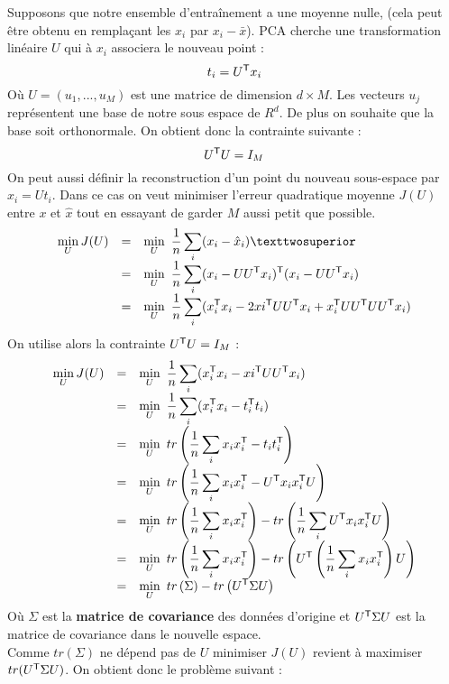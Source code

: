 Supposons que notre ensemble d'entraînement a une moyenne nulle, (cela peut être obtenu en remplaçant les $x_i$ par $x_i - \bar{x}$). PCA cherche une transformation linéaire $U$ qui à $x_i$ associera le nouveau point :
$$ t_i = U^{\mathsf{T}} x_i $$
Où $U = (u_1, ..., u_M)$ est une matrice de dimension $d \times M$. Les vecteurs $u_j$ représentent une base de notre sous espace de $R^d$. De plus on souhaite que la base soit orthonormale. On obtient donc la contrainte suivante :
$$ U^{\mathsf{T}} U = I_M $$
On peut aussi définir la reconstruction d'un point du nouveau sous-espace par $\hat{x}_i = U t_i$. Dans ce cas on veut minimiser l'erreur quadratique moyenne $J(U)$ entre $x$ et $\hat{x}$ tout en essayant de garder $M$ aussi petit que possible.
$$ \begin{array}{lll}
\displaystyle \min_U J(U)
& = & \displaystyle \min_U~\dfrac{1}{n} \sum_i (x_i - \hat{x}_i)² \\
& = & \displaystyle \min_U~\dfrac{1}{n} \sum_i (x_i - UU^\trans x_i)^\trans (x_i - UU^\trans x_i) \\
& = & \displaystyle \min_U~\dfrac{1}{n} \sum_i (x_i^\trans x_i - 2 xi^\trans UU^\trans x_i + x_i^\trans U U^\trans U U^\trans x_i)
\end{array} $$
On utilise alors la contrainte $U^{\mathsf{T}} U = I_M$ :
$$ \begin{array}{lll}
\displaystyle \min_U J(U)
& = & \displaystyle \min_U~\dfrac{1}{n} \sum_i (x_i^{\mathsf{T}} x_i - xi^{\mathsf{T}} UU^{\mathsf{T}} x_i) \\
& = & \displaystyle \min_U~\dfrac{1}{n} \sum_i (x_i^{\mathsf{T}} x_i - t_i^{\mathsf{T}} t_i) \\
& = & \displaystyle \min_U~tr \left( \dfrac{1}{n} \sum_i x_i x_i^{\mathsf{T}} - t_i t_i^{\mathsf{T}} \right) \\
& = & \displaystyle \min_U~tr \left( \dfrac{1}{n} \sum_i x_i x_i^{\mathsf{T}} - U^{\mathsf{T}} x_i x_i^{\mathsf{T}} U \right) \\
& = & \displaystyle \min_U~tr \left( \dfrac{1}{n} \sum_i x_i x_i^{\mathsf{T}} \right) - tr \left( \dfrac{1}{n} \sum_i U^{\mathsf{T}} x_i x_i^{\mathsf{T}} U \right) \\
& = & \displaystyle \min_U~tr \left( \dfrac{1}{n} \sum_i x_i x_i^{\mathsf{T}} \right) - tr \left( U^{\mathsf{T}} \left( \dfrac{1}{n} \sum_i x_i x_i^{\mathsf{T}} \right) U \right) \\
& = & \displaystyle \min_U~tr \left( \Sigma \right) - tr \left( U^{\mathsf{T}} \Sigma U \right)
\end{array} $$
Où {\boldmath $\Sigma$} est la \textbf{matrice de covariance} des données d'origine et $U^{\mathsf{T}} \Sigma U$ est la matrice de covariance dans le nouvelle espace. \\
Comme $tr(\Sigma)$ ne dépend pas de $U$ minimiser $J(U)$ revient à maximiser $tr(U^{\mathsf{T}} \Sigma U)$. On obtient donc le problème suivant :
\begin{center}
\end{center}

